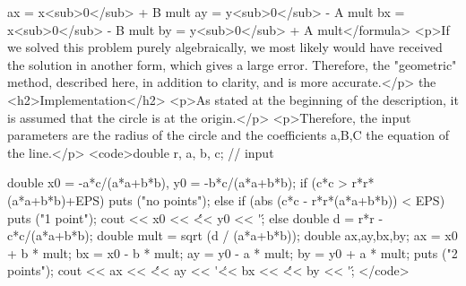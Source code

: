 ax = x<sub>0</sub> + B mult
ay = y<sub>0</sub> - A mult
bx = x<sub>0</sub> - B mult
by = y<sub>0</sub> + A mult</formula>
<p>If we solved this problem purely algebraically, we most likely would have received the solution in another form, which gives a large error. Therefore, the "geometric" method, described here, in addition to clarity, and is more accurate.</p>
the <h2>Implementation</h2>
<p>As stated at the beginning of the description, it is assumed that the circle is at the origin.</p>
<p>Therefore, the input parameters are the radius of the circle and the coefficients a,B,C the equation of the line.</p>
<code>double r, a, b, c; // input

double x0 = -a*c/(a*a+b*b), y0 = -b*c/(a*a+b*b);
if (c*c > r*r*(a*a+b*b)+EPS)
puts ("no points");
else if (abs (c*c - r*r*(a*a+b*b)) < EPS) {
puts ("1 point");
cout << x0 << \' \' << y0 << \'\n\';
}
else {
double d = r*r - c*c/(a*a+b*b);
double mult = sqrt (d / (a*a+b*b));
double ax,ay,bx,by;
ax = x0 + b * mult;
bx = x0 - b * mult;
ay = y0 - a * mult;
by = y0 + a * mult;
puts ("2 points");
cout << ax << \' \' << ay << \'\n\' << bx << \' \' << by << \'\n\';
}</code>